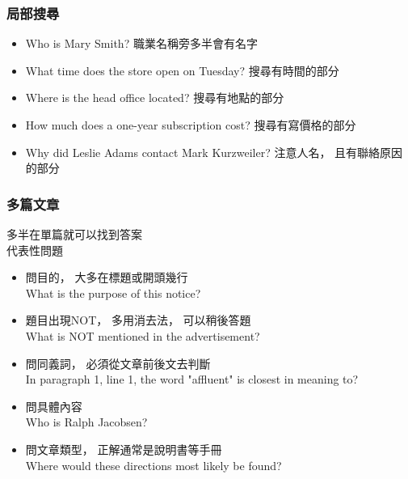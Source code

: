 \documentclass{beamer}
\begin{document}
{\begin{CJK*}{UTF8}{bkai}
\begin{frame}
\frametitle{局部搜尋}
\begin{itemize}
\item Who is Mary Smith? 職業名稱旁多半會有名字
\item What time does the store open on Tuesday? 搜尋有時間的部分
\item Where is the head office located? 搜尋有地點的部分
\item How much does a one-year subscription cost? 搜尋有寫價格的部分
\item Why did Leslie Adams contact Mark Kurzweiler? 注意人名， 且有聯絡原因的部分
\end{itemize}
\end{frame}


\begin{frame}
\frametitle{多篇文章}
多半在單篇就可以找到答案\\
代表性問題
\begin{itemize}
\item 問目的， 大多在標題或開頭幾行\\
What is the purpose of this notice?
\item 題目出現NOT， 多用消去法， 可以稍後答題 \\
What is NOT mentioned in the advertisement?
\item 問同義詞， 必須從文章前後文去判斷\\
In paragraph 1, line 1, the word "affluent" is closest in meaning to?
\item 問具體內容\\
Who is Ralph Jacobsen?

\item 問文章類型， 正解通常是說明書等手冊\\
Where would these directions most likely be found?
\end{itemize}
\end{frame}


\end{CJK*}}
\end{document}
